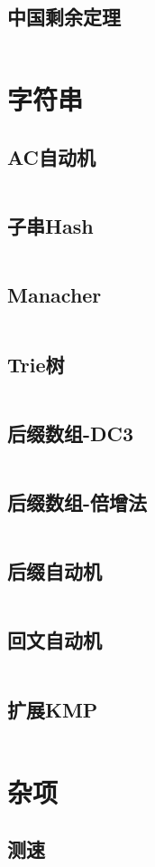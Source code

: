 \documentclass[UTF8]{ctexart}
\begin{document}
\subsection{中国剩余定理}
\inputminted{cpp}{math/中国剩余定理.cpp}
\section{字符串}
\subsection{AC自动机}
\inputminted{cpp}{string/AC自动机.cpp}
\subsection{子串Hash}
\inputminted{cpp}{string/Hash.cpp}
\subsection{Manacher}
\inputminted{cpp}{string/Manacher回文串.cpp}
\subsection{Trie树}
\inputminted{cpp}{string/Trie树.cpp}
\subsection{后缀数组-DC3}
\inputminted{cpp}{string/后缀数组-DC3.cpp}
\subsection{后缀数组-倍增法}
\inputminted{cpp}{string/后缀数组-倍增法.cpp}
\subsection{后缀自动机}
\inputminted{cpp}{string/后缀自动机.cpp}
\subsection{回文自动机}
\inputminted{cpp}{string/回文自动机.cpp}
\subsection{扩展KMP}
\inputminted{cpp}{string/扩展KMP.cpp}
\section{杂项}
\subsection{测速}
\inputminted{cpp}{others/chrono.cpp}
\end{document}
